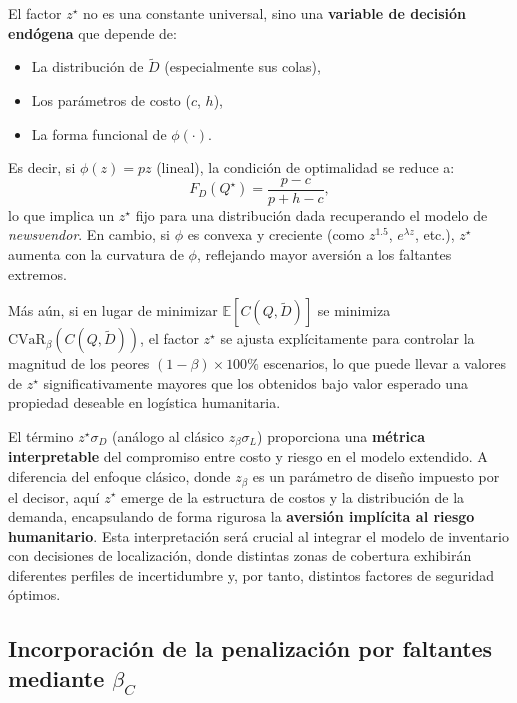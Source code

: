 \documentclass[
  spanish,
  us-letterpaper,
  DIV=11,
  numbers=noendperiod]{scrreprt}
\providecommand{\tightlist}{%
  \setlength{\itemsep}{0pt}\setlength{\parskip}{0pt}}
\numberwithin{equation}{section}
\begin{document}
El factor \(z^\star\) no es una constante universal, sino una
\textbf{variable de decisión endógena} que depende de:

\begin{itemize}
\tightlist
\item
  La distribución de \(\tilde{D}\) (especialmente sus colas),
\item
  Los parámetros de costo (\(c\), \(h\)),
\item
  La forma funcional de \(\phi(\cdot)\).
\end{itemize}

Es decir, si \(\phi(z) = p z\) (lineal), la condición de optimalidad se
reduce a: \[
F_D(Q^\star) = \frac{p - c}{p + h - c},
\] lo que implica un \(z^\star\) fijo para una distribución dada
recuperando el modelo de \emph{newsvendor}. En cambio, si \(\phi\) es
convexa y creciente (como \(z^{1.5}\), \(e^{\lambda z}\), etc.),
\(z^\star\) aumenta con la curvatura de \(\phi\), reflejando mayor
aversión a los faltantes extremos.

Más aún, si en lugar de minimizar \(\mathbb{E}[C(Q,\tilde{D})]\) se
minimiza \(\text{CVaR}_\beta(C(Q,\tilde{D}))\), el factor \(z^\star\) se
ajusta explícitamente para controlar la magnitud de los peores
\((1 - \beta) \times 100\%\) escenarios, lo que puede llevar a valores
de \(z^\star\) significativamente mayores que los obtenidos bajo valor
esperado una propiedad deseable en logística humanitaria.

El término \(z^\star \sigma_D\) (análogo al clásico
\(z_\beta \sigma_L\)) proporciona una \textbf{métrica interpretable} del
compromiso entre costo y riesgo en el modelo extendido. A diferencia del
enfoque clásico, donde \(z_\beta\) es un parámetro de diseño impuesto
por el decisor, aquí \(z^\star\) emerge de la estructura de costos y la
distribución de la demanda, encapsulando de forma rigurosa la
\textbf{aversión implícita al riesgo humanitario}. Esta interpretación
será crucial al integrar el modelo de inventario con decisiones de
localización, donde distintas zonas de cobertura exhibirán diferentes
perfiles de incertidumbre y, por tanto, distintos factores de seguridad
óptimos.

\subsection{\texorpdfstring{Incorporación de la penalización por
faltantes mediante
\(\beta_C\)}{Incorporación de la penalización por faltantes mediante \textbackslash beta\_C}}\label{incorporaciuxf3n-de-la-penalizaciuxf3n-por-faltantes-mediante-beta_c}
\end{document}

